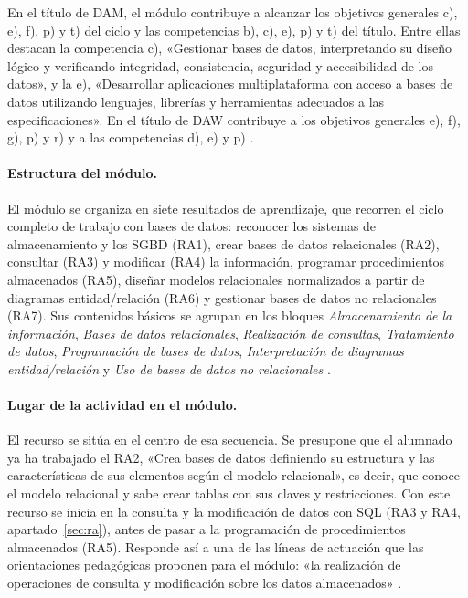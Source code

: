 \documentclass[11pt,a4paper]{article}
\begin{document}
En el título de DAM, el módulo contribuye a alcanzar los objetivos generales c), e), f), p)
y t) del ciclo y las competencias b), c), e), p) y t) del título. Entre ellas destacan la
competencia c), «Gestionar bases de datos, interpretando su diseño lógico y verificando
integridad, consistencia, seguridad y accesibilidad de los datos», y la e), «Desarrollar
aplicaciones multiplataforma con acceso a bases de datos utilizando lenguajes, librerías y
herramientas adecuados a las especificaciones». En el título de DAW contribuye a los
objetivos generales e), f), g), p) y r) y a las competencias d), e) y p) \cite{rd405}.

\paragraph{Estructura del módulo.} El módulo se organiza en siete resultados de aprendizaje,
que recorren el ciclo completo de trabajo con bases de datos: reconocer los sistemas de
almacenamiento y los SGBD (RA1), crear bases de datos relacionales (RA2), consultar (RA3)
y modificar (RA4) la información, programar procedimientos almacenados (RA5), diseñar
modelos relacionales normalizados a partir de diagramas entidad/relación (RA6) y gestionar
bases de datos no relacionales (RA7). Sus contenidos básicos se agrupan en los bloques
\emph{Almacenamiento de la información}, \emph{Bases de datos relacionales},
\emph{Realización de consultas}, \emph{Tratamiento de datos}, \emph{Programación de bases de
datos}, \emph{Interpretación de diagramas entidad/relación} y \emph{Uso de bases de datos no
relacionales} \cite{rd405}.

\paragraph{Lugar de la actividad en el módulo.} El recurso se sitúa en el centro de esa
secuencia. Se presupone que el alumnado ya ha trabajado el RA2, «Crea bases de datos
definiendo su estructura y las características de sus elementos según el modelo
relacional», es decir, que conoce el modelo relacional y sabe crear tablas con sus claves y
restricciones. Con este recurso se inicia en la consulta y la modificación de datos con SQL
(RA3 y RA4, apartado~\ref{sec:ra}), antes de pasar a la programación de procedimientos
almacenados (RA5). Responde así a una de las líneas de actuación que las orientaciones
pedagógicas proponen para el módulo: «la realización de operaciones de consulta y
modificación sobre los datos almacenados» \cite{rd405}.
\end{document}
